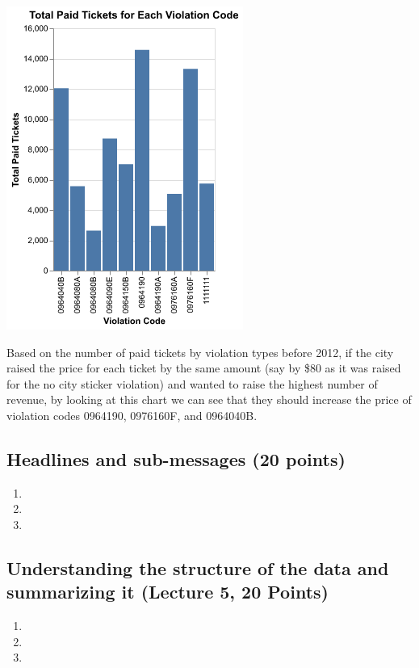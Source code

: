 \documentclass[
]{article}
\providecommand{\tightlist}{%
  \setlength{\itemsep}{0pt}\setlength{\parskip}{0pt}}\usepackage{longtable,booktabs,array}
\begin{document}
\includegraphics[width=3.05208in,height=4.16667in]{pset2_template_files/figure-pdf/cell-30-output-1.png}

Based on the number of paid tickets by violation types before 2012, if
the city raised the price for each ticket by the same amount (say by
\$80 as it was raised for the no city sticker violation) and wanted to
raise the highest number of revenue, by looking at this chart we can see
that they should increase the price of violation codes 0964190,
0976160F, and 0964040B.

\subsection{Headlines and sub-messages (20
points)}\label{headlines-and-sub-messages-20-points}

\begin{enumerate}
\def\labelenumi{\arabic{enumi}.}
\tightlist
\item
\item
\item
\end{enumerate}

\subsection{Understanding the structure of the data and summarizing it
(Lecture 5, 20
Points)}\label{understanding-the-structure-of-the-data-and-summarizing-it-lecture-5-20-points}

\begin{enumerate}
\def\labelenumi{\arabic{enumi}.}
\tightlist
\item
\item
\item
\end{enumerate}
\end{document}
